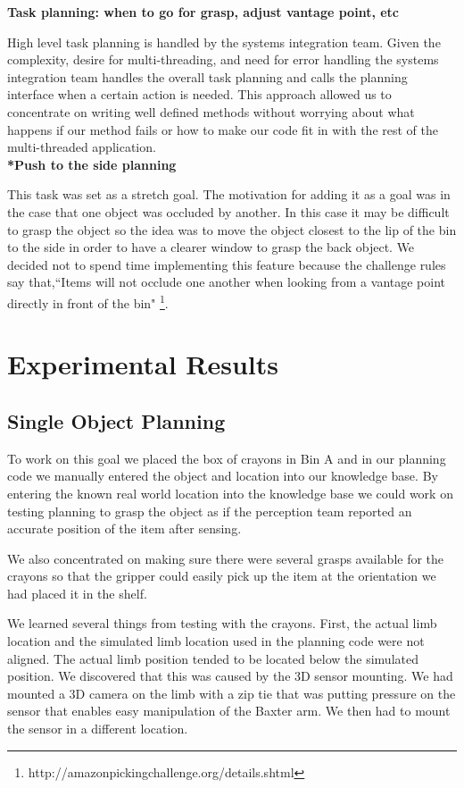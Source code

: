 \documentclass[12pt]{article}
\begin{document}
\noindent\textbf{Task planning: when to go for grasp, adjust vantage point, etc}

High level task planning is handled by the systems integration team. Given the complexity, desire for multi-threading, and need for error handling the systems integration team handles the overall task planning and calls the planning interface when a certain action is needed. This approach allowed us to concentrate on writing well defined methods without worrying about what happens if our method fails or how to make our code fit in with the rest of the multi-threaded application.\\

\noindent\textbf{*Push to the side planning}

This task was set as a stretch goal. The motivation for adding it as a goal was in the case that one object was occluded by another. In this case it may be difficult to grasp the object so the idea was to move the object closest to the lip of the bin to the side in order to have a clearer window to grasp the back object. We decided not to spend time implementing this feature because the challenge rules say that,``Items will not occlude one another when looking from a vantage point directly in front of the bin" \footnote{http://amazonpickingchallenge.org/details.shtml}.

\section{Experimental Results}

\subsection{Single Object Planning}
To work on this goal we placed the box of crayons in Bin A and in our planning code we manually entered the object and location into our knowledge base. By entering the known real world location into the knowledge base we could work on testing planning to grasp the object as if the perception team reported an accurate position of the item after sensing.

We also concentrated on making sure there were several grasps available for the crayons so that the gripper could easily pick up the item at the orientation we had placed it in the shelf.

We learned several things from testing with the crayons. First, the actual limb location and the simulated limb location used in the planning code were not aligned. The actual limb position tended to be located below the simulated position. We discovered that this was caused by the 3D sensor mounting. We had mounted a 3D camera on the limb with a zip tie that was putting pressure on the sensor that enables easy manipulation of the Baxter arm. We then had to mount the sensor in a different location.
\end{document}
